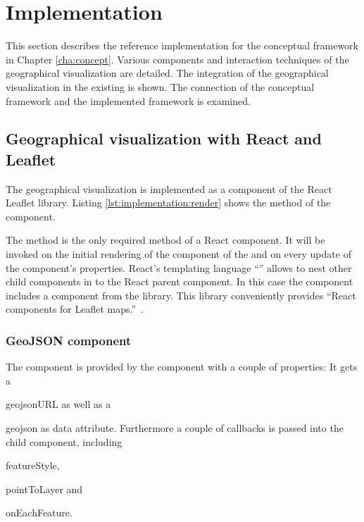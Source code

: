 \chapter{Implementation}\label{sec:implementation}

This section describes the reference implementation for the conceptual framework in Chapter \ref{cha:concept}.
Various components and interaction techniques of the geographical visualization are detailed.
The integration of the geographical visualization in the existing \visan{} is shown.
The connection of the conceptual framework and the implemented framework is examined.

\section{Geographical visualization with React and Leaflet}

The geographical visualization is implemented as a  component of the React Leaflet library.
Listing \ref{lst:implementation:render} shows the  method of the component.



The  method is the only required method of a React component.
It will be invoked on the initial rendering of the component of the  and on every update of the component's properties.
React's templating language ``'' allows to nest other child components in to the React parent component.
In this case the  component includes a   component from the  library.
This library conveniently provides ``React components for Leaflet maps.''~\cite{ReactLeaflet2017}.

\subsection{GeoJSON component}

The  component is provided by the  component with a couple of properties:
It gets a
\begin{enumerate*}[label=(\arabic*)]
  \item
    geojsonURL as well as a
  \item
    geojson as data attribute. Furthermore a couple of callbacks is passed into the child component, including
  \item
    featureStyle,
  \item
    pointToLayer and
  \item
    onEachFeature.
\end{enumerate*}

